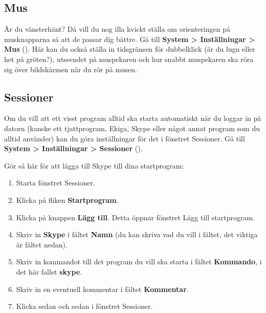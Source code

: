 \documentclass[a4paper,final]{memoir} %
\begin{document}
\subsection{Mus}


Är du vänsterhänt? Då vill du nog illa kvickt ställa om orienteringen på musknapparna så att de passar dig bättre. Gå till  \textbf{System \textgreater{} Inställningar \textgreater{} Mus} (). Här kan du också ställa in tidsgränsen för dubbelklick (är du lugn eller het på gröten?), utseendet på muspekaren och hur snabbt muspekaren ska röra sig över bildskärmen när du rör på musen.



\subsection{Sessioner}


Om du vill att ett visst program alltid ska starta automatiskt när du loggar in på datorn (kanske ett tjattprogram, Ekiga, Skype eller något annat program som du alltid använder) kan du göra inställningar för det i fönstret Sessioner.  Gå till \textbf{System \textgreater{} Inställningar \textgreater{} Sessioner} ().


Gör så här för att lägga till Skype till dina startprogram:

\begin{enumerate}

\item Starta fönstret Sessioner.

\item Klicka på fliken \textbf{Startprogram}.

\item Klicka på knappen \textbf{Lägg till}. Detta öppnar fönstret Lägg till startprogram.

\item Skriv in \textbf{Skype} i fältet \textbf{Namn} (du kan skriva vad du vill i fältet, det viktiga är fältet nedan).

\item Skriv in kommandot till det program du vill ska starta i fältet \textbf{Kommando}, i det här fallet \textbf{skype}.

\item Skriv in en eventuell kommentar i fältet \textbf{Kommentar}.

\item Klicka sedan \xok{} och sedan \xstang{} i fönstret Sessioner.

\end{enumerate}
\end{document}
